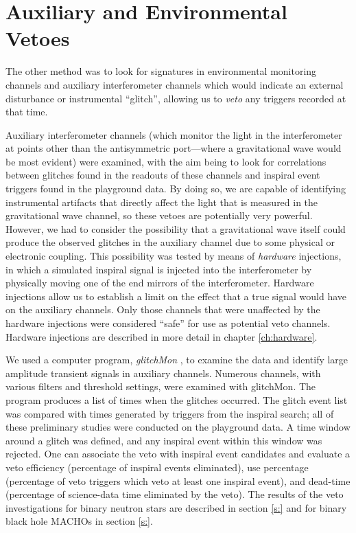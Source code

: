 \section{Auxiliary and Environmental Vetoes}
\label{s:dq}

The other method was to look for signatures in environmental monitoring
channels and auxiliary interferometer channels which would indicate an
external disturbance or instrumental ``glitch'', allowing us to {\it veto} any
triggers recorded at that time.

Auxiliary interferometer channels (which monitor the light in the
interferometer at points other than the antisymmetric port---where a
gravitational wave would be most evident) were examined, with the aim being to
look for correlations between glitches found in the readouts of these channels
and inspiral event triggers found in the playground data.  By doing so, we are
capable of identifying instrumental artifacts that directly affect the light
that is measured in the gravitational wave channel, so these vetoes are
potentially very powerful.  However, we had to consider the possibility that a
gravitational wave itself could produce the observed glitches in the auxiliary
channel due to some physical or electronic coupling.  This possibility was
tested by means of {\em hardware} injections, in which a simulated inspiral
signal is injected into the interferometer by physically moving one of the end
mirrors of the interferometer. Hardware injections allow us to establish a
limit on the effect that a true signal would have on the auxiliary channels.
Only those channels that were unaffected by the hardware injections were
considered ``safe'' for use as potential veto channels. Hardware injections
are described in more detail in chapter \ref{ch:hardware}.

We used a computer program, {\it glitchMon} \cite{glitchMon}, to examine the
data and identify large amplitude transient signals in auxiliary channels.
Numerous channels, with various filters and threshold settings, were examined
with glitchMon. The program produces a list of times when the glitches
occurred. The glitch event list was compared with times generated by triggers
from the inspiral search; all of these preliminary studies were conducted on
the playground data. A time window around a glitch was defined, and any
inspiral event within this window was rejected. One can associate the veto
with inspiral event candidates and evaluate a veto efficiency (percentage of
inspiral events eliminated), use percentage (percentage of veto triggers which
veto at least one inspiral event), and dead-time (percentage of science-data
time eliminated by the veto). The results of the veto investigations for
binary neutron stars are described in section \ref{s:} and for binary black
hole MACHOs in section \ref{s:}.

